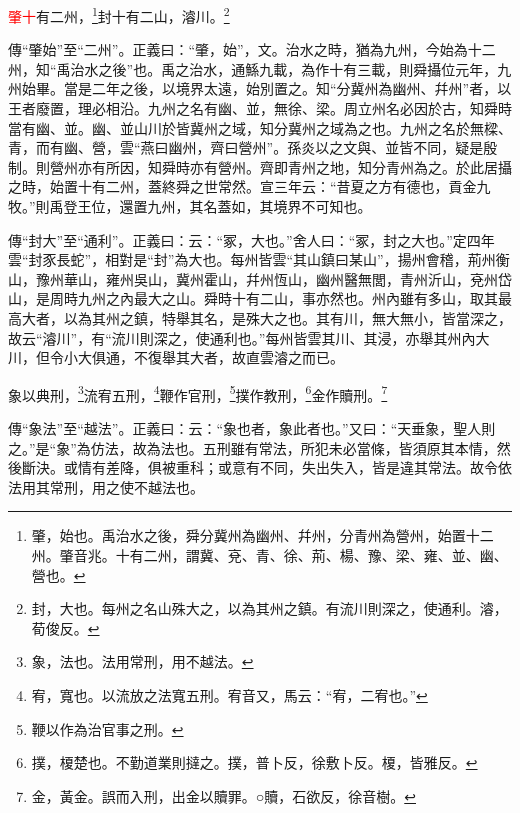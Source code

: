 \textcolor{red}{肇十}有二州，\footnote{肇，始也。禹治水之後，舜分冀州為幽州、幷州，分青州為營州，始置十二州。肇音兆。十有二州，謂冀、兗、青、徐、荊、楊、豫、梁、雍、並、幽、營也。}封十有二山，濬川。\footnote{封，大也。每州之名山殊大之，以為其州之鎮。有流川則深之，使通利。濬，荀俊反。}

{\noindent\zhuan{}\fzbyks 傳“肇始”至“二州”。正義曰：“肇，始”，文。治水之時，猶為九州，今始為十二州，知“禹治水之後”也。禹之治水，通鯀九載，為作十有三載，則舜攝位元年，九州始畢。當是二年之後，以境界太遠，始別置之。知“分冀州為幽州、幷州”者，以王者廢置，理必相沿。九州之名有幽、並，無徐、梁。周立州名必因於古，知舜時當有幽、並。幽、並山川於皆冀州之域，知分冀州之域為之也。九州之名於無樑、青，而有幽、營，雲“燕曰幽州，齊曰營州”。孫炎以之文與、並皆不同，疑是殷制。則營州亦有所因，知舜時亦有營州。齊即青州之地，知分青州為之。於此居攝之時，始置十有二州，蓋終舜之世常然。宣三年云：“昔夏之方有德也，貢金九牧。”則禹登王位，還置九州，其名蓋如，其境界不可知也。 \par}

{\noindent\zhuan{}\fzbyks 傳“封大”至“通利”。正義曰：云：“冢，大也。”舍人曰：“冢，封之大也。”定四年雲“封豕長蛇”，相對是“封”為大也。每州皆雲“其山鎮曰某山”，揚州會稽，荊州衡山，豫州華山，雍州吳山，冀州霍山，幷州恆山，幽州醫無閭，青州沂山，兗州岱山，是周時九州之內最大之山。舜時十有二山，事亦然也。州內雖有多山，取其最高大者，以為其州之鎮，特舉其名，是殊大之也。其有川，無大無小，皆當深之，故云“濬川”，有“流川則深之，使通利也。”每州皆雲其川、其浸，亦舉其州內大川，但令小大俱通，不復舉其大者，故直雲濬之而已。 \par}

象以典刑，\footnote{象，法也。法用常刑，用不越法。}流宥五刑，\footnote{宥，寬也。以流放之法寬五刑。宥音又，馬云：“宥，二宥也。”}鞭作官刑，\footnote{鞭以作為治官事之刑。}撲作教刑，\footnote{撲，榎楚也。不勤道業則撻之。撲，普卜反，徐敷卜反。榎，皆雅反。}金作贖刑。\footnote{金，黃金。誤而入刑，出金以贖罪。○贖，石欲反，徐音樹。}

{\noindent\zhuan{}\fzbyks 傳“象法”至“越法”。正義曰：云：“象也者，象此者也。”又曰：“天垂象，聖人則之。”是“象”為仿法，故為法也。五刑雖有常法，所犯未必當條，皆須原其本情，然後斷決。或情有差降，俱被重科；或意有不同，失出失入，皆是違其常法。故令依法用其常刑，用之使不越法也。 \par}

